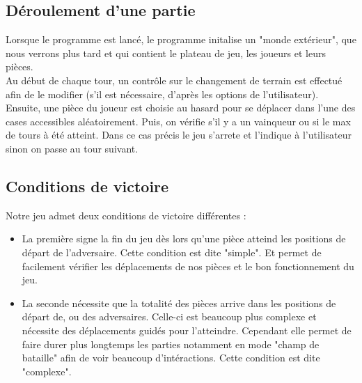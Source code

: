         \subsection{Déroulement d'une partie}
            Lorsque le programme est lancé, le programme initalise un "monde extérieur", que nous verrons plus tard et qui contient le plateau de jeu, les joueurs et leurs pièces. \\
            \newline
            Au début de chaque tour, un contrôle sur le changement de terrain est effectué afin de le modifier (s'il est nécessaire, d'après les options de l'utilisateur). \\
            Ensuite, une pièce du joueur est choisie au hasard pour se déplacer dans l'une des cases accessibles aléatoirement. Puis, on vérifie s'il y a un vainqueur ou si le max de tours à été atteint. Dans ce cas précis le jeu s'arrete et l'indique à l'utilisateur sinon on passe au tour suivant.
            
        \subsection{Conditions de victoire}
            Notre jeu admet deux conditions de victoire différentes :
            \begin{itemize}
                \item La première signe la fin du jeu dès lors qu'une pièce atteind les positions de départ de l'adversaire. Cette condition est dite "simple". Et permet de facilement vérifier les déplacements de nos pièces et le bon fonctionnement du jeu.
                \item La seconde nécessite que la totalité des pièces arrive dans les positions de départ de, ou des adversaires. Celle-ci est beaucoup plus complexe et nécessite des déplacements guidés pour l'atteindre. Cependant elle permet de faire durer plus longtemps les parties notamment en mode "champ de bataille" afin de voir beaucoup d'intéractions. Cette condition est dite "complexe".
            \end{itemize}